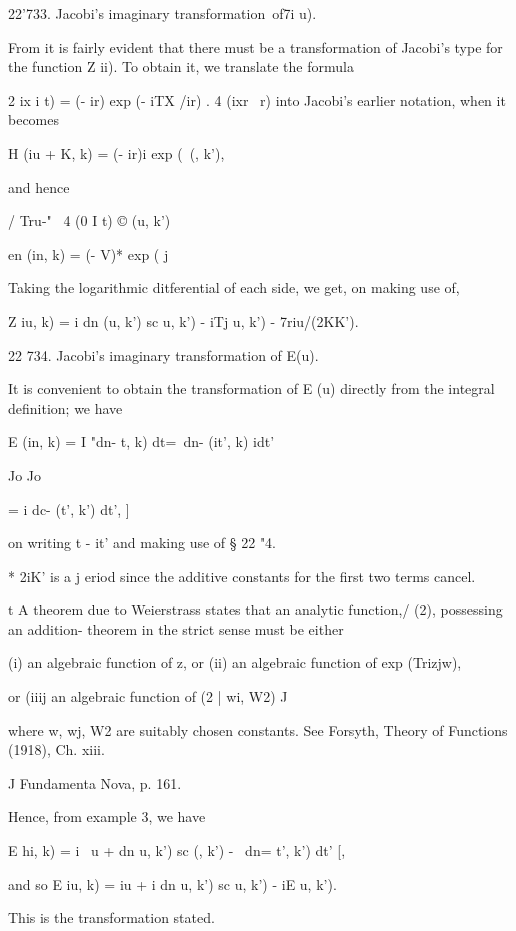 22'733. Jacobi's imaginary transformation\ of7i u).

From it is fairly evident that there must be a transformation
of Jacobi's type for the function Z ii). To obtain it, we translate
the formula

 2 ix i t) = (- ir) exp (- iTX /ir) . 4 (ixr \ r) into Jacobi's
earlier notation, when it becomes

H (iu + K, k) = (- ir)i exp (\ (, k'),

and hence

/ Tru-" \ 4 (0 I t) © (u, k')

en (in, k) = (- V)* exp ( j

Taking the logarithmic ditferential of each side, we get, on making
use of,

Z iu, k) = i dn (u, k') sc u, k') - iTj u, k') - 7riu/(2KK').

22 734. Jacobi's imaginary transformation of E(u).

It is convenient to obtain the transformation of E (u) directly from
the integral definition; we have

E (in, k) = I "dn- t, k) dt=\ dn- (it', k) idt'

Jo Jo

= i dc- (t', k') dt', ]

on writing t - it' and making use of § 22 "4.

* 2iK' is a j eriod since the additive constants for the first two
terms cancel.

t A theorem due to Weierstrass states that an analytic function,/ (2),
possessing an addition- theorem in the strict sense must be either

(i) an algebraic function of z, or (ii) an algebraic function of exp
(Trizjw),

or (iiij an algebraic function of (2 | wi, W2) J

where w, wj, W2 are suitably chosen constants. See Forsyth, Theory of
Functions (1918), Ch. xiii.

J Fundamenta Nova, p. 161.

%
%

Hence, from example 3, we have

E hi, k) = i \ u + dn u, k') sc (, k') - \ dn= t', k') dt' [,

and so E iu, k) = iu + i dn u, k') sc u, k') - iE u, k').

This is the transformation stated.

